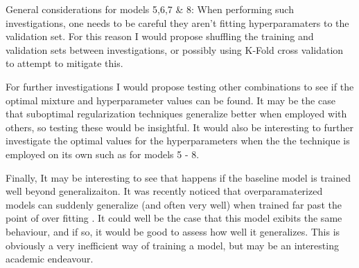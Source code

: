 {{\begin{itemize}
\end{itemize}

General considerations for models 5,6,7 \& 8: When performing such investigations, one needs to be careful they aren't fitting hyperparamaters to the validation set. For this reason I would propose shuffling the training and validation sets between investigations, or possibly using K-Fold cross validation to attempt to mitigate this.

For further investigations I would propose testing other combinations to see if the optimal mixture and hyperparameter values can be found. It may be the case that suboptimal regularization techniques generalize better when employed with others, so testing these would be insightful. It would also be interesting to further investigate the optimal values for the hyperparameters when the the technique is employed on its own such as for models 5 - 8.

Finally, It may be interesting to see that happens if the baseline model is trained well beyond generalizaiton. It was recently noticed that overparamaterized models can suddenly generalize (and often very well) when trained far past the point of over fitting \citep{Power2022}. It could well be the case that this model exibits the same behaviour, and if so, it would be good to assess how well it generalizes. This is obviously a very inefficient way of training a model, but may be an interesting academic endeavour.
}
}



